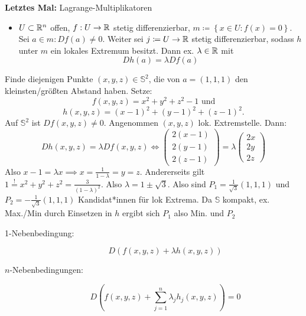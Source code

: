 \textbf{Letztes Mal:} Lagrange-Multiplikatoren
\begin{itemize}
	\item $ U \subset \mathbb{R} ^n $ offen, $ f: U \to \mathbb{R}  $ stetig differenzierbar, $ m \coloneqq \left\{ x \in U: f(x) = 0 \right\}  $.
		Sei $ a \in m : Df(a) \neq 0 $. Weiter sei $ j \coloneqq U \to \mathbb{R}  $ stetig differenzierbar, sodass $ h $ unter $ m $ ein lokales Extremum besitzt.
		Dann ex. $ \lambda \in \mathbb{R}  $ mit
		\[
			Dh(a) = \lambda Df(a)
		\]
\end{itemize}

Finde diejenigen Punkte $ (x, y, z) \in \mathbb{S} ^{2}  $, die von $ a = (1, 1, 1) $ den kleinsten/größten Abstand haben.
Setze:
\[
	f(x, y, z) = x^2 + y^2 + z^2 - 1 \text{ und} 
\]
\[
	h(x, y, z) = \left( x - 1 \right) ^2 + (y-1)^2 + (z - 1)^2.
\]
Auf $ \mathbb{S}^2 $ ist $ Df(x, y, z) \neq 0 $.
Angenommen $ (x, y, z) $ lok. Extremstelle.
Dann: 
\[
	Dh(x, y, z) = \lambda Df(x, y, z) \iff \begin{pmatrix} 2(x - 1) \\ 2(y - 1) \\ 2(z - 1) \end{pmatrix} = \lambda \begin{pmatrix} 2x \\ 2y \\ 2z \end{pmatrix} 
\]
Also $ x - 1 = \lambda x \implies x = \frac{ 1 }{ 1 - \lambda } = y = z $.
Andererseits gilt $ 1 \overset{!}{=} x^2 + y^2 + z^2 = \frac{ 3 }{ (1 - \lambda)^2 }  $.
Also $ \lambda = 1 \pm \sqrt{3}  $.
Also sind $ P_1 = \frac{ 1 }{ \sqrt{3}  } (1, 1, 1) $ und $ P_2 = - \frac{ 1 }{ \sqrt{3}  } (1, 1, 1) $ Kandidat*innen für lok Extrema.
Da $ \mathbb{S} $ kompakt, ex. Max./Min durch Einsetzen in $ h $ ergibt sich $ P_1 $ also Min. und $ P_2 $ 

\begin{description}
	\item[1-Nebenbedingung:]
		\[
			D(f(x, y, z) + \lambda h(x, y, z))
		\]
	\item[$ n $-Nebenbedingungen:] 
		\[
			D \left( f(x, y, z) + \sum_{j=1}^{n} \lambda_j h_j (x, y, z) \right) = 0
		\]
\end{description}

